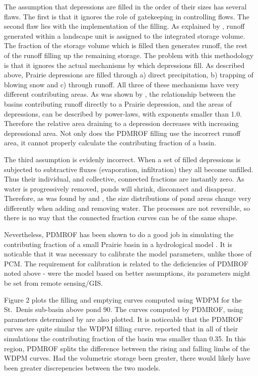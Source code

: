 \documentclass[draft,linenumbers]{agujournal2018}
\begin{document}
The assumption that depressions are filled in the order of their sizes
has several flaws. The first is that it ignores the role of gatekeeping
in controlling flows. The second flaw lies with the implementation of
the filling. As explained by \citet{mekonnenImprovedLandSurface2014},
runoff generated within a landscape unit is assigned to the integrated
storage volume. The fraction of the storage volume which is filled then
generates runoff, the rest of the runoff filling up the remaining
storage. The problem with this methodology is that it ignores the actual
mechanisms by which depressions fill. As described above, Prairie
depressions are filled through a) direct precipitation, b) trapping of
blowing snow and c) through runoff. All three of these mechanisms have
very different contributing areas. As was shown by
\citet{shookStorageDynamicsSimulations2013}, the relationship between
the basins contributing runoff directly to a Prairie depression, and the
areas of depressions, can be described by power-laws, with exponents
smaller than 1.0. Therefore the relative area draining to a depression
decreases with increasing depressional area. Not only does the PDMROF
filling use the incorrect runoff area, it cannot properly calculate the
contributing fraction of a basin.

The third assumption is evidenly incorrect. When a set of filled
depressions is subjected to subtractive fluxes (evaporation,
infiltration) they all become unfilled. Thus their individual, and
collective, connected fractions are instantly zero. As water is
progressively removed, ponds will shrink, disconnect and disappear.
Therefore, as was found by \citet{shookMemoryEffectsDepressional2011}
and \citet{shookStorageDynamicsSimulations2013}, the size distributions
of pond areas change very differently when adding and removing water.
The processes are not reversible, so there is no way that the connected
fraction curves can be of the same shape.

Nevertheless, PDMROF has been shown to do a good job in simulating the
contributing fraction of a small Prairie basin in a hydrological model
\citep{mengistuTestingAbilitySemidistributed2016}. It is noticable that
it was necessary to calibrate the model parameters, unlike those of PCM.
The requirement for calibration is related to the deficiencies of PDMROF
noted above - were the model based on better assumptions, its parameters
might be set from remote sensing/GIS.

Figure 2 plots the filling and emptying curves computed using WDPM for
the St.~Denis sub-basin above pond 90. The curves computed by PDMROF,
using parameters determined by
\citet{mengistuTestingAbilitySemidistributed2016} are also plotted. It
is noticeable that the PDMROF curves are quite similar the WDPM filling
curve. \citet{mengistuTestingAbilitySemidistributed2016} reported that
in all of their simulations the contributing fraction of the basin was
smaller than 0.35. In this region, PDMROF splits the difference between
the rising and falling limbs of the WDPM curves. Had the volumetric
storage been greater, there would likely have been greater discrepencies
between the two models.
\end{document}
